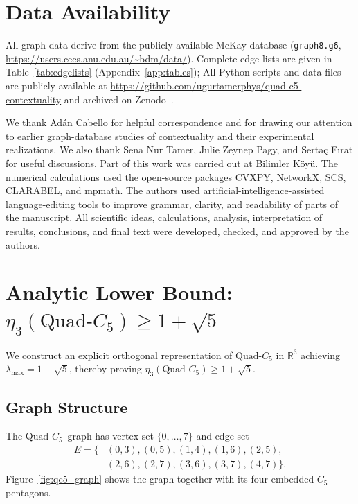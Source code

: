 \documentclass[aps,pra,twocolumn,superscriptaddress,longbibliography,floatfix]{revtex4-2}
\newcommand{\QC}{\ensuremath{\text{Quad-}C_5}}
\begin{document}
\section*{Data Availability}

All graph data derive from the publicly available McKay database
(\texttt{graph8.g6},
\url{https://users.cecs.anu.edu.au/~bdm/data/}).
Complete edge lists are given in Table~\ref{tab:edgelists} (Appendix~\ref{app:tables});
All Python scripts and data files are publicly available at
\url{https://github.com/ugurtamerphys/quad-c5-contextuality} and archived on
Zenodo~\cite{Tamer2026zenodo}.

\begin{acknowledgments}
We thank Ad\'{a}n Cabello for helpful correspondence and for drawing our
attention to earlier graph-database studies of contextuality and their
experimental realizations.
We also thank Sena Nur Tamer, Julie Zeynep Pagy, and Serta\c{c} F{\i}rat
for useful discussions.
Part of this work was carried out at Bilimler K\"{o}y\"{u}.
The numerical calculations used the open-source packages CVXPY, NetworkX,
SCS, CLARABEL, and mpmath.
The authors used artificial-intelligence-assisted language-editing tools to improve grammar,
clarity, and readability of parts of the manuscript.
All scientific ideas, calculations, analysis, interpretation of results,
conclusions, and final text were developed, checked, and approved by the
authors.
\end{acknowledgments}

\appendix
\section{Analytic Lower Bound: $\eta_3(\QC)\geq 1+\sqrt{5}$}
\label{app:analytic}

We construct an explicit orthogonal representation of $\QC$ in $\mathbb{R}^3$
achieving $\lambda_{\max}=1+\sqrt{5}$, thereby proving $\eta_3(\QC)\geq 1+\sqrt{5}$.

\subsection{Graph Structure}

The \QC\ graph has vertex set $\{0,\ldots,7\}$ and edge set
\begin{align*}
  E = \{&(0,3),(0,5),(1,4),(1,6),(2,5),\\
        &(2,6),(2,7),(3,6),(3,7),(4,7)\}.
\end{align*}
Figure~\ref{fig:qc5_graph} shows the graph together with its four embedded
$C_5$ pentagons.
\end{document}
